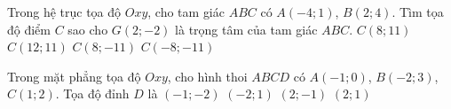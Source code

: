 \begin{ex}%
Trong hệ trục tọa độ $Oxy$, cho tam giác $ABC$ có $A(-4;1)$, $B(2;4)$. Tìm tọa độ điểm $C$ sao cho $G(2;-2)$ là trọng tâm của tam giác $ABC$.
\choice
{$C(8;11)$}
{$C(12;11)$}
{\True $C(8;-11)$}
{$C(-8;-11)$}
\end{ex}

\begin{ex}%
	Trong mặt phẳng tọa độ $Oxy$, cho hình thoi $ABCD$ có $A(-1;0)$, $B(-2;3)$, $C(1;2)$. Tọa độ đỉnh $D$ là
	\choice
	{$(-1;-2)$}
	{$(-2;1)$}
	{\True $(2;-1)$}
	{$(2;1)$}
	\end{ex}

